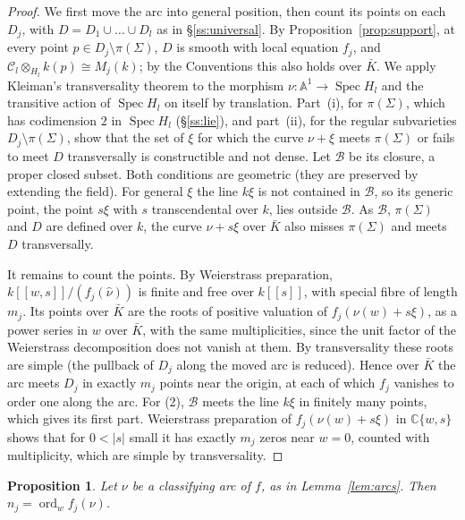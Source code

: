 \documentclass[11pt]{amsart}
\numberwithin{table}{section}
\numberwithin{figure}{section}
\numberwithin{equation}{section}
\newtheorem{prop}[thm]{Proposition}
\theoremstyle{definition}
\theoremstyle{plain}
\newcommand{\cC}{\mathcal{C}}
\newcommand{\C}{\mathbb{C}}
\newcommand{\A}{\mathbb{A}}
\DeclareMathOperator{\Spec}{Spec}
\DeclareMathOperator{\ord}{ord}
\begin{document}
\begin{proof}
We first move the arc into general position, then count its points on each $D_j$, with $D = D_1 \cup \dots \cup D_l$ as in \S\ref{ss:universal}. By Proposition~\ref{prop:support}, at every point $p \in D_j \setminus \pi(\Sigma)$, $D$ is smooth with local equation $f_j$, and $\cC_l \otimes_{H_l} k(p) \cong M_j(k)$; by the Conventions this also holds over $\bar K$. We apply Kleiman's transversality theorem \cite[Thm~2]{Kl} to the morphism $\nu\colon \A^1 \to \Spec H_l$ and the transitive action of $\Spec H_l$ on itself by translation. Part~(i), for $\pi(\Sigma)$, which has codimension $2$ in $\Spec H_l$ (\S\ref{ss:lie}), and part~(ii), for the regular subvarieties $D_j \setminus \pi(\Sigma)$, show that the set of $\xi$ for which the curve $\nu + \xi$ meets $\pi(\Sigma)$ or fails to meet $D$ transversally is constructible and not dense. Let $\mathcal B$ be its closure, a proper closed subset. Both conditions are geometric (they are preserved by extending the field). For general $\xi$ the line $k\xi$ is not contained in $\mathcal B$, so its generic point, the point $s\xi$ with $s$ transcendental over $k$, lies outside $\mathcal B$. As $\mathcal B$, $\pi(\Sigma)$ and $D$ are defined over $k$, the curve $\nu + s\xi$ over $\bar K$ also misses $\pi(\Sigma)$ and meets $D$ transversally.

It remains to count the points. By Weierstrass preparation, $k[[w, s]]/(f_j(\hat\nu))$ is finite and free over $k[[s]]$, with special fibre of length $m_j$. Its points over $\bar K$ are the roots of positive valuation of $f_j(\nu(w) + s\xi)$, as a power series in $w$ over $\bar K$, with the same multiplicities, since the unit factor of the Weierstrass decomposition does not vanish at them. By transversality these roots are simple (the pullback of $D_j$ along the moved arc is reduced). Hence over $\bar K$ the arc meets $D_j$ in exactly $m_j$ points near the origin, at each of which $f_j$ vanishes to order one along the arc. For (2), $\mathcal B$ meets the line $k\xi$ in finitely many points, which gives its first part. Weierstrass preparation of $f_j(\nu(w) + s\xi)$ in $\C\{w, s\}$ shows that for $0 < |s|$ small it has exactly $m_j$ zeros near $w = 0$, counted with multiplicity, which are simple by transversality.
\end{proof}

\begin{prop}\label{prop:GV}
Let $\nu$ be a classifying arc of $f$, as in Lemma~\ref{lem:arcs}. Then $n_j = \ord_w f_j(\nu)$.
\end{prop}
\end{document}
